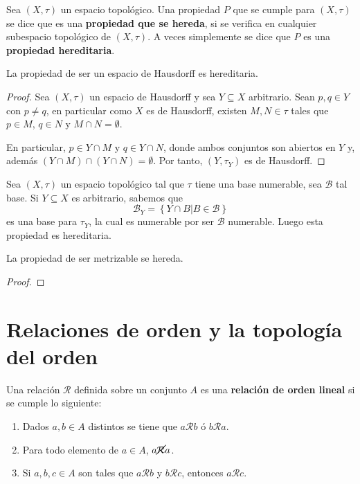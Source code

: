 \documentclass[12pt]{report}
\theoremstyle{largebreak}
\begin{document}
    \begin{mydef}
        Sea $(X,\tau)$ un espacio topológico. Una propiedad $P$ que se cumple para $(X,\tau)$ se dice que es una \textbf{propiedad que se hereda}, si se verifica en cualquier subespacio topológico de $(X,\tau)$. A veces simplemente se dice que $P$ es una \textbf{propiedad hereditaria}.
    \end{mydef}

    \begin{exa}
        La propiedad de ser un espacio de Hausdorff es hereditaria.
    \end{exa}

    \begin{proof}
        Sea $(X,\tau)$ un espacio de Hausdorff y sea $Y\subseteq X$ arbitrario. Sean $p,q\in Y$ con $p\neq q$, en particular como $X$ es de Hausdorff, existen $M,N\in\tau$ tales que $p\in M$, $q\in N$ y $M\cap N=\emptyset$.

        En particular, $p\in Y\cap M$ y $q\in Y\cap N$, donde ambos conjuntos son abiertos en $Y$ y, además $(Y\cap M)\cap (Y\cap N)=\emptyset$. Por tanto, $(Y,\tau_Y)$ es de Hausdorff.
    \end{proof}

    \begin{exa}
        Sea $(X,\tau)$ un espacio topológico tal que $\tau$ tiene una base numerable, sea $\mathcal{B}$ tal base. Si $Y\subseteq X$ es arbitrario, sabemos que
        \begin{equation*}
            \mathcal{B}_Y=\left\{Y\cap B\Big|B\in\mathcal{B} \right\}
        \end{equation*}
        es una base para $\tau_Y$, la cual es numerable por ser $\mathcal{B}$ numerable. Luego esta propiedad es hereditaria.
    \end{exa}

    \begin{excer}
        La propiedad de ser metrizable se hereda.
    \end{excer}

    \begin{proof}
        
    \end{proof}

    \section{Relaciones de orden y la topología del orden}

    \begin{mydef}
        Una relación $\mathcal{R}$ definida sobre un conjunto $A$ es una \textbf{relación de orden lineal} si se cumple lo siguiente:
        \begin{enumerate}
            \item Dados $a,b\in A$ distintos se tiene que $a\mathcal{R}b$ ó $b\mathcal{R}a$.
            \item Para todo elemento de $a\in A$, $a\cancel{\mathcal{R}}a$.
            \item Si $a,b,c\in A$ son tales que $a\mathcal{R}b$ y $b\mathcal{R}c$, entonces $a\mathcal{R}c$.
        \end{enumerate}
    \end{mydef}
\end{document}
